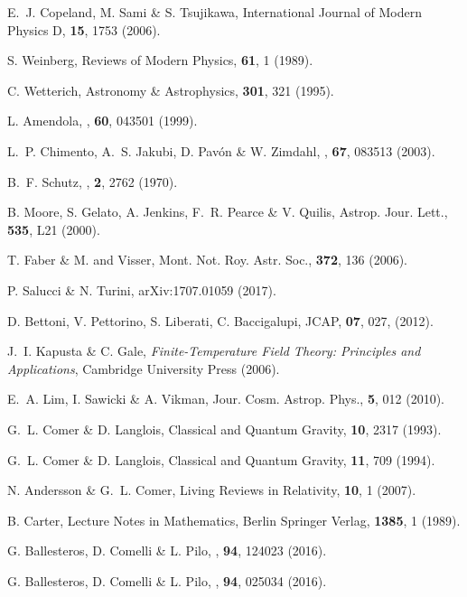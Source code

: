 \documentclass[twocolumn,showpacs, nofootinbib,aps,superscriptaddress, eqsecnum,prd,prl,notitlepage,showkeys,10pt,reprint]{revtex4-1}
\def\mnras{Mont. Not. Roy. Astr. Soc.}
\def\apjl{Astrop. Jour. Lett.}
\def\aap{Astronomy \& Astrophysics}
\def\jcap{Jour. Cosm. Astrop. Phys.}
\begin{document}
\begin{thebibliography}{37}

E.~J. Copeland, M. Sami \& S. Tsujikawa, International Journal of Modern Physics D, \textbf{15}, 1753 (2006).

S. Weinberg, Reviews of Modern Physics, \textbf{61}, 1 (1989).

C. Wetterich, \aap, \textbf{301}, 321 (1995).

L. Amendola, \prd, \textbf{60}, 043501 (1999).

L.~P. Chimento, A.~S. Jakubi, D. Pav{\'o}n \& W. Zimdahl, \prd, \textbf{67}, 083513 (2003).

B.~F. Schutz, \prd, \textbf{2}, 2762 (1970).

B. Moore, S. Gelato, A. Jenkins, F.~R. Pearce \& V. Quilis, \apjl, \textbf{535}, L21 (2000).

%
T. Faber \& M. and Visser, \mnras, \textbf{372}, 136 (2006).

%
P. Salucci \& N. Turini, arXiv:1707.01059 (2017).

D. Bettoni, V. Pettorino, S. Liberati, C. Baccigalupi, JCAP, {\bf 07}, 027, (2012).

%
J.~I. Kapusta \& C. Gale, \textit{Finite-Temperature Field Theory: Principles and Applications}, Cambridge University Press (2006).

E.~A. Lim, I. Sawicki \& A. Vikman, \jcap, \textbf{5}, 012 (2010).

%
G.~L. Comer \& D. Langlois, Classical and Quantum Gravity, \textbf{10}, 2317 (1993).

%
G.~L. Comer \& D. Langlois, Classical and Quantum Gravity, \textbf{11}, 709 (1994).

N. Andersson \& G.~L. Comer, Living Reviews in Relativity, \textbf{10}, 1 (2007).

B. Carter, Lecture Notes in Mathematics, Berlin Springer Verlag, \textbf{1385}, 1 (1989).

%
G. Ballesteros, D. Comelli \& L. Pilo, \prd, \textbf{94}, 124023 (2016).

G. Ballesteros, D. Comelli \& L. Pilo, \prd, \textbf{94}, 025034 (2016).


\end{thebibliography}
\end{document}
